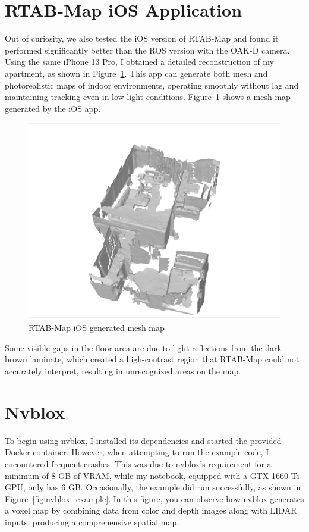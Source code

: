 \FloatBarrier
\section{RTAB-Map iOS Application}

Out of curiosity, we also tested the iOS version of RTAB-Map and found it performed significantly better than the ROS version with the OAK-D camera. Using the same iPhone 13 Pro, I obtained a detailed reconstruction of my apartment, as shown in Figure~\ref{fig:rtabmap_ios}. This app can generate both mesh and photorealistic maps of indoor environments, operating smoothly without lag and maintaining tracking even in low-light conditions. Figure~\ref{fig:rtabmap_ios} shows a mesh map generated by the iOS app.

\begin{figure}[htbp]
	\centering
	\includegraphics[width=150mm, keepaspectratio]{figures_jpg/rtabmap_ios.jpg}
	\caption{RTAB-Map iOS generated mesh map}
	\label{fig:rtabmap_ios}
\end{figure}
\FloatBarrier

Some visible gaps in the floor area are due to light reflections from the dark brown laminate, which created a high-contrast region that RTAB-Map could not accurately interpret, resulting in unrecognized areas on the map.


\section{Nvblox}

To begin using nvblox, I installed its dependencies and started the provided Docker container. However, when attempting to run the example code, I encountered frequent crashes. This was due to nvblox’s requirement for a minimum of 8 GB of VRAM, while my notebook, equipped with a GTX 1660 Ti GPU, only has 6 GB. Occasionally, the example did run successfully, as shown in Figure~\ref{fig:nvblox_example}. In this figure, you can observe how nvblox generates a voxel map by combining data from color and depth images along with LIDAR inputs, producing a comprehensive spatial map.

